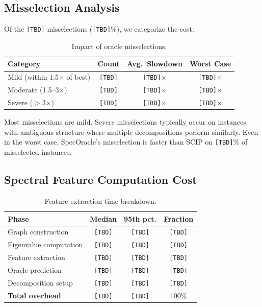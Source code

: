 \documentclass[11pt]{article}
\begin{document}
\subsection{Misselection Analysis}

Of the \texttt{[TBD]} misselections (\texttt{[TBD]}\%), we categorize the cost:

\begin{table}[t]
\centering
\caption{Impact of oracle misselections.}
\begin{tabular}{lccc}
\toprule
\textbf{Category} & \textbf{Count} & \textbf{Avg.\ Slowdown} & \textbf{Worst Case} \\
\midrule
Mild (within 1.5$\times$ of best) & \texttt{[TBD]} & \texttt{[TBD]}$\times$ & \texttt{[TBD]}$\times$ \\
Moderate (1.5--3$\times$) & \texttt{[TBD]} & \texttt{[TBD]}$\times$ & \texttt{[TBD]}$\times$ \\
Severe ($>$3$\times$) & \texttt{[TBD]} & \texttt{[TBD]}$\times$ & \texttt{[TBD]}$\times$ \\
\bottomrule
\end{tabular}
\end{table}

Most misselections are mild. Severe misselections typically occur on instances with ambiguous structure where multiple decompositions perform similarly. Even in the worst case, SpecOracle's misselection is faster than SCIP on \texttt{[TBD]}\% of misselected instances.

\subsection{Spectral Feature Computation Cost}

\begin{table}[t]
\centering
\caption{Feature extraction time breakdown.}
\begin{tabular}{lccc}
\toprule
\textbf{Phase} & \textbf{Median} & \textbf{95th pct.} & \textbf{Fraction} \\
\midrule
Graph construction & \texttt{[TBD]} & \texttt{[TBD]} & \texttt{[TBD]} \\
Eigenvalue computation & \texttt{[TBD]} & \texttt{[TBD]} & \texttt{[TBD]} \\
Feature extraction & \texttt{[TBD]} & \texttt{[TBD]} & \texttt{[TBD]} \\
Oracle prediction & \texttt{[TBD]} & \texttt{[TBD]} & \texttt{[TBD]} \\
Decomposition setup & \texttt{[TBD]} & \texttt{[TBD]} & \texttt{[TBD]} \\
\midrule
\textbf{Total overhead} & \texttt{[TBD]} & \texttt{[TBD]} & 100\% \\
\bottomrule
\end{tabular}
\end{table}
\end{document}
